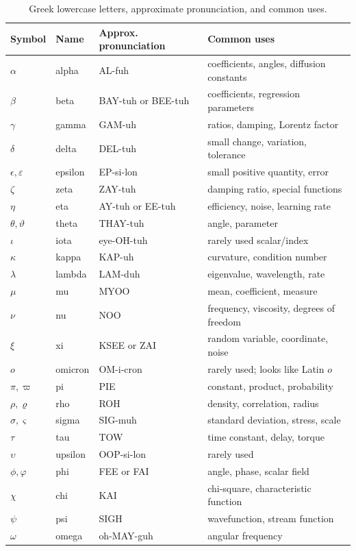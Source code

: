 \documentclass[11pt,twocolumn]{article}
\begin{document}
\begin{table}[t]
\centering
\caption{Greek lowercase letters, approximate pronunciation, and common uses.}
\begin{tabular}{llll}
\toprule
Symbol & Name & Approx. pronunciation & Common uses \\
\midrule
$\alpha$ & alpha & AL-fuh & coefficients, angles, diffusion constants \\
$\beta$ & beta & BAY-tuh or BEE-tuh & coefficients, regression parameters \\
$\gamma$ & gamma & GAM-uh & ratios, damping, Lorentz factor \\
$\delta$ & delta & DEL-tuh & small change, variation, tolerance \\
$\epsilon,\varepsilon$ & epsilon & EP-si-lon & small positive quantity, error \\
$\zeta$ & zeta & ZAY-tuh & damping ratio, special functions \\
$\eta$ & eta & AY-tuh or EE-tuh & efficiency, noise, learning rate \\
$\theta,\vartheta$ & theta & THAY-tuh & angle, parameter \\
$\iota$ & iota & eye-OH-tuh & rarely used scalar/index \\
$\kappa$ & kappa & KAP-uh & curvature, condition number \\
$\lambda$ & lambda & LAM-duh & eigenvalue, wavelength, rate \\
$\mu$ & mu & MYOO & mean, coefficient, measure \\
$\nu$ & nu & NOO & frequency, viscosity, degrees of freedom \\
$\xi$ & xi & KSEE or ZAI & random variable, coordinate, noise \\
$o$ & omicron & OM-i-cron & rarely used; looks like Latin \(o\) \\
$\pi,\varpi$ & pi & PIE & constant, product, probability \\
$\rho,\varrho$ & rho & ROH & density, correlation, radius \\
$\sigma,\varsigma$ & sigma & SIG-muh & standard deviation, stress, scale \\
$\tau$ & tau & TOW & time constant, delay, torque \\
$\upsilon$ & upsilon & OOP-si-lon & rarely used \\
$\phi,\varphi$ & phi & FEE or FAI & angle, phase, scalar field \\
$\chi$ & chi & KAI & chi-square, characteristic function \\
$\psi$ & psi & SIGH & wavefunction, stream function \\
$\omega$ & omega & oh-MAY-guh & angular frequency \\
\bottomrule
\end{tabular}
\end{table}
\end{document}
